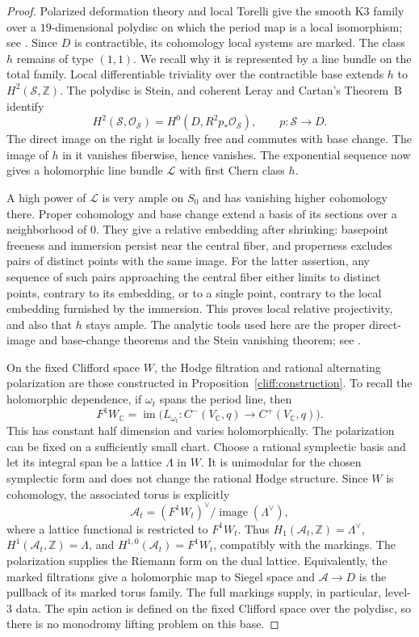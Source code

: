 \begin{proof}
Polarized deformation theory and local Torelli give the smooth K3
family over a $19$-dimensional polydisc on which the period map is a
local isomorphism; see \cite[Chapter~6, Section~2]{Huybrechts}.
Since $D$ is contractible, its cohomology local systems are marked.
The class $h$ remains of type $(1,1)$.  We recall why it is represented
by a line bundle on the total family.
Local differentiable triviality over the contractible base extends
$h$ to $H^2(\mathcal S,\mathbb Z)$.  The polydisc is Stein, and coherent
Leray and Cartan's Theorem~B identify
\[
 H^2(\mathcal S,\mathcal O_{\mathcal S})
 =H^0(D,R^2p_*\mathcal O_{\mathcal S}),
 \qquad p:\mathcal S\to D.
\]
The direct image on the right is locally free and commutes with base
change.  The image of $h$ in it vanishes fiberwise, hence vanishes.
The exponential sequence now gives a holomorphic line bundle
$\mathcal L$ with first Chern class $h$.

A high power of $\mathcal L$ is very ample on $S_0$ and has vanishing
higher cohomology there.  Proper cohomology and base change extend a
basis of its sections over a neighborhood of $0$.  They give a
relative embedding after shrinking: basepoint freeness and immersion
persist near the central fiber, and properness excludes pairs of
distinct points with the same image.  For the latter assertion, any
sequence of such pairs approaching the central fiber either limits
to distinct points, contrary to its embedding, or to a single point,
contrary to the local embedding furnished by the immersion.
This proves local relative projectivity, and also that $h$ stays ample.
The analytic tools used here are the proper direct-image and base-change
theorems and the Stein vanishing theorem; see
\cite[\S6, Hauptsatz~I; \S7, S\"atze~3,5; \S2, Satz~3]{Grauert}.

On the fixed Clifford space $W$, the Hodge filtration and rational
alternating polarization are those constructed in
Proposition~\ref{cliff:construction}.  To recall the holomorphic dependence,
if $\omega_t$ spans the period line, then
\[
 F^1W_{\mathbb C}
 =\operatorname{im}\bigl(L_{\omega_t}:C^-(V_{\mathbb C},q)
                                      \longrightarrow C^+(V_{\mathbb C},q)\bigr).
\]
This has constant half dimension and varies holomorphically.
The polarization can be fixed on a sufficiently small chart.
Choose a rational symplectic basis and let its integral span be a
lattice $\Lambda$ in $W$. It is unimodular for the chosen symplectic form and
does not change the rational Hodge structure.
Since $W$ is cohomology, the associated torus is explicitly
\[
 \mathcal A_t=(F^1W_t)^\vee/\operatorname{image}(\Lambda^\vee),
\]
where a lattice functional is restricted to $F^1W_t$.
Thus $H_1(\mathcal A_t,\mathbb Z)=\Lambda^\vee$,
$H^1(\mathcal A_t,\mathbb Z)=\Lambda$, and
$H^{1,0}(\mathcal A_t)=F^1W_t$, compatibly with the markings.
The polarization supplies the Riemann form on the dual lattice.
Equivalently, the marked filtrations give a holomorphic map to Siegel
space and $\mathcal A\to D$ is the pullback of its marked torus family.
The full markings supply, in particular, level-$3$ data. The spin
action is defined on the fixed Clifford space over the polydisc,
so there is no monodromy lifting problem on this base.


\end{proof}
